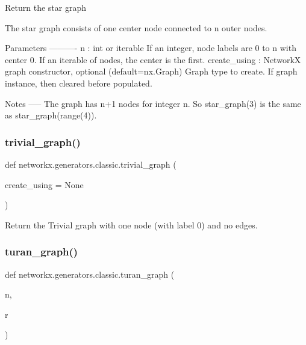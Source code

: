 \begin{DoxyVerb}Return the star graph

The star graph consists of one center node connected to n outer nodes.

Parameters
----------
n : int or iterable
    If an integer, node labels are 0 to n with center 0.
    If an iterable of nodes, the center is the first.
create_using : NetworkX graph constructor, optional (default=nx.Graph)
   Graph type to create. If graph instance, then cleared before populated.

Notes
-----
The graph has n+1 nodes for integer n.
So star_graph(3) is the same as star_graph(range(4)).
\end{DoxyVerb}
 \mbox{\label{namespacenetworkx_1_1generators_1_1classic_a96b7963652c898ec831f49d688d5a7b3}} 
\subsubsection{\texorpdfstring{trivial\+\_\+graph()}{trivial\_graph()}}
{\footnotesize\ttfamily def networkx.\+generators.\+classic.\+trivial\+\_\+graph (\begin{DoxyParamCaption}\item[{}]{create\+\_\+using = {\ttfamily None} }\end{DoxyParamCaption})}

\begin{DoxyVerb}Return the Trivial graph with one node (with label 0) and no edges.\end{DoxyVerb}
 \mbox{\label{namespacenetworkx_1_1generators_1_1classic_abfb69342a777ad423fd6247bd9752e6b}} 
\subsubsection{\texorpdfstring{turan\+\_\+graph()}{turan\_graph()}}
{\footnotesize\ttfamily def networkx.\+generators.\+classic.\+turan\+\_\+graph (\begin{DoxyParamCaption}\item[{}]{n,  }\item[{}]{r }\end{DoxyParamCaption})}

